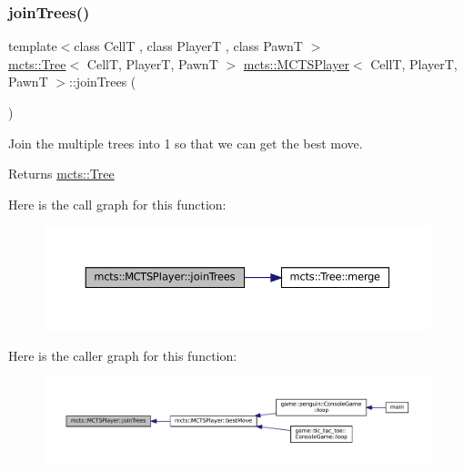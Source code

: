 \mbox{\label{classmcts_1_1_m_c_t_s_player_a9e8202cd2530b6ecc20f873d899823da}} 
\subsubsection{\texorpdfstring{join\+Trees()}{joinTrees()}}
{\footnotesize\ttfamily template$<$class CellT , class PlayerT , class PawnT $>$ \\
\hyperlink{classmcts_1_1_tree}{mcts\+::\+Tree}$<$ CellT, PlayerT, PawnT $>$ \hyperlink{classmcts_1_1_m_c_t_s_player}{mcts\+::\+M\+C\+T\+S\+Player}$<$ CellT, PlayerT, PawnT $>$\+::join\+Trees (\begin{DoxyParamCaption}{ }\end{DoxyParamCaption})\hspace{0.3cm}{\ttfamily [protected]}}



Join the multiple trees into 1 so that we can get the best move. 

\begin{DoxyReturn}{Returns}
\hyperlink{classmcts_1_1_tree}{mcts\+::\+Tree} 
\end{DoxyReturn}
Here is the call graph for this function\+:
\nopagebreak
\begin{figure}[H]
\begin{center}
\leavevmode
\includegraphics[width=350pt]{classmcts_1_1_m_c_t_s_player_a9e8202cd2530b6ecc20f873d899823da_cgraph}
\end{center}
\end{figure}
Here is the caller graph for this function\+:
\nopagebreak
\begin{figure}[H]
\begin{center}
\leavevmode
\includegraphics[width=350pt]{classmcts_1_1_m_c_t_s_player_a9e8202cd2530b6ecc20f873d899823da_icgraph}
\end{center}
\end{figure}
\mbox{\label{classmcts_1_1_m_c_t_s_player_a53677f7c7f9cfe4b7999af8abcfb8641}} 
